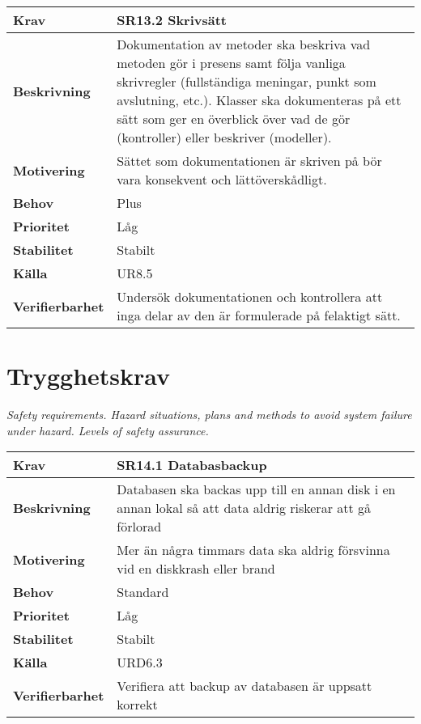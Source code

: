 \documentclass[a4paper, twoside, 11pt, titlepage]{article}
\begin{document}
\begin{tabular} { p{2.6cm} p{12.5cm} }
	\hline
	\sffamily\textbf{Krav} & \sffamily\textbf{SR13.2 Skrivsätt } \\
	\hline
	\sffamily\textbf{Beskrivning} & Dokumentation av metoder ska beskriva vad metoden gör i presens samt följa vanliga skrivregler (fullständiga meningar, punkt som avslutning, etc.). Klasser ska dokumenteras på ett sätt som ger en överblick över vad de gör (kontroller) eller beskriver (modeller).  \\
	\hline
	\sffamily\textbf{Motivering} & Sättet som dokumentationen är skriven på bör vara konsekvent och lättöverskådligt.  \\
	\hline
	\sffamily\textbf{Behov} & Plus  \\
	\hline
	\sffamily\textbf{Prioritet} & Låg  \\
	\hline
	\sffamily\textbf{Stabilitet} & Stabilt  \\
	\hline
	\sffamily\textbf{Källa} & UR8.5  \\
	\hline
	\sffamily\textbf{Verifierbarhet} & Undersök dokumentationen och kontrollera att inga delar av den är formulerade på felaktigt sätt.  \\
	\hline
\end{tabular}


\clearpage
\section{Trygghetskrav}


\emph{Safety requirements. Hazard situations, plans and methods to avoid system failure under hazard. Levels of safety assurance.}

\begin{tabular} { p{2.6cm} p{12.5cm} }
	\hline
	\sffamily\textbf{Krav} & \sffamily\textbf{SR14.1 Databasbackup } \\
	\hline
	\sffamily\textbf{Beskrivning} & Databasen ska backas upp till en annan disk i en annan lokal så att data aldrig riskerar att gå förlorad  \\
	\hline
	\sffamily\textbf{Motivering} & Mer än några timmars data ska aldrig försvinna vid en diskkrash eller brand  \\
	\hline
	\sffamily\textbf{Behov} & Standard  \\
	\hline
	\sffamily\textbf{Prioritet} & Låg  \\
	\hline
	\sffamily\textbf{Stabilitet} & Stabilt  \\
	\hline
	\sffamily\textbf{Källa} & URD6.3  \\
	\hline
	\sffamily\textbf{Verifierbarhet} & Verifiera att backup av databasen är uppsatt korrekt  \\
	\hline
\end{tabular}
\end{document}
